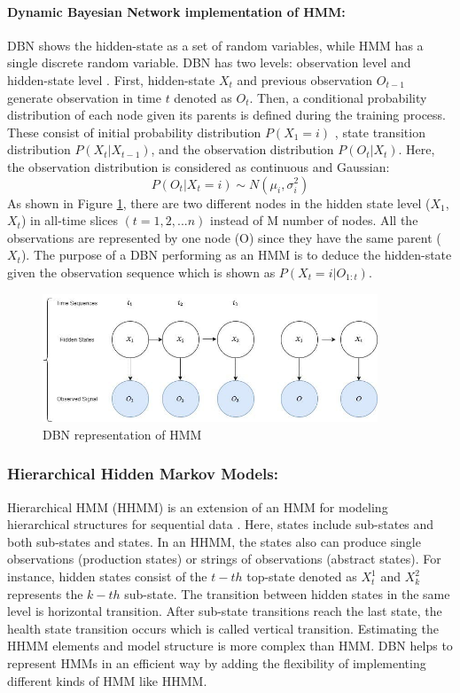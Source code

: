 \paragraph{Dynamic Bayesian Network implementation of HMM:}
DBN shows the hidden-state as a set of random variables, while HMM has a single discrete random variable. DBN has two levels: observation level and hidden-state level \cite{camci2005dynamic}.
First, hidden-state $X_{t}$ and previous observation $O_{t-1}$ generate observation in time $t$ denoted as $O_{t}$. Then, a conditional probability distribution of each node given its parents is defined during the training process. These consist of initial probability distribution $P(X_{1}=i)$  , state transition distribution $P(X_{t}|X_{t-1})$, and the observation distribution $P(O_{t}|X_{t})$. Here, the observation distribution is considered as continuous and Gaussian:
\begin{equation}
P(O_{t}|X_{t}=i)\sim N(\mu_{i},\sigma _{i}^{2})
\end{equation}
As shown in Figure \ref{fig:DBN representation of HMM}, there are two different nodes in the hidden state level ($X_{1}$,$X_{t}$) in all-time slices $(t=1,2,...n)$ instead of M number of nodes. All the observations are represented by one node (O) since they have the same parent ($X_{t}$).
The purpose of a DBN performing as an HMM is to deduce the hidden-state given the observation sequence which is shown as $P(X_{t}=i|O_{1:t})$.
\begin{figure}[H]
	\centering
	\includegraphics[width=10cm]{gfx/DBN_representation_of_HMM.png}
    \captionsetup{justification=centering}
	\caption{DBN representation of HMM}
	\label{fig:DBN representation of HMM}
\end{figure}

\subsubsection*{Hierarchical Hidden Markov Models:}
Hierarchical HMM (HHMM) is an extension of an HMM for modeling hierarchical structures for sequential data \cite{camci2005dynamic, DBLP:journals/tase/CamciC10}. Here, states include sub-states and both sub-states
and states. In an HHMM, the states also can produce single observations (production states) or strings of observations (abstract states). For instance, hidden states consist of the $t-th$ top-state denoted as  $X_{t}^{1}$ and  $X_{k}^{2}$ represents the $k-th$ sub-state. The transition between hidden states in the same level is horizontal transition. After sub-state transitions reach the last state, the health state transition occurs which is called vertical transition. Estimating the HHMM elements and model structure is more complex than HMM. DBN helps to represent HMMs in an efficient way by adding the flexibility of implementing different kinds of HMM like HHMM.

